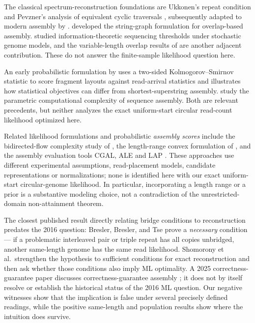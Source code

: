 The classical spectrum-reconstruction foundations are Ukkonen's repeat
condition and Pevzner's analysis of equivalent cyclic traversals
\parencite{ukkonen1992,pevzner1995}, subsequently adapted to modern
assembly by \textcite{bresler2013}.
\textcite{myers2005} developed the string-graph formulation for
overlap-based assembly. \textcite{motahari2013} studied information-theoretic sequencing thresholds
under stochastic genome models, and the variable-length overlap
results of \textcite{hui2016} are another adjacent
contribution. These do not answer the finite-sample likelihood
question here.

An early probabilistic formulation by \textcite{myers1995}
uses a two-sided Kolmogorov--Smirnov statistic to score fragment
layouts against read-arrival statistics and illustrates how
statistical objectives can differ from shortest-superstring
assembly. \textcite{nagarajan2009} study the parametric
computational complexity of sequence assembly. Both are
relevant precedents, but neither analyzes the exact
uniform-start circular read-count likelihood optimized here.

Related likelihood formulations and probabilistic
\emph{assembly scores} include the bidirected-flow
complexity study of \textcite{medvedev2007},
the length-range convex formulation of \textcite{varma2011},
and the assembly evaluation tools CGAL, ALE and LAP
\parencite{cgal2013,ale2013,ghodsi2013}.
These approaches use different experimental assumptions,
read-placement models, candidate representations or
normalizations; none is identified here with our exact
uniform-start circular-genome likelihood. In particular,
incorporating a length range or a prior is a substantive
modeling choice, not a contradiction of the
unrestricted-domain non-attainment theorem.

The closest published result directly relating bridge
conditions to reconstruction predates the 2016 question:
Bresler, Bresler, and Tse prove a \emph{necessary} condition --- if a
problematic interleaved pair or triple repeat has all copies unbridged, another
same-length genome has the same read likelihood. Shomorony et al.\ strengthen
the hypothesis to sufficient conditions for exact reconstruction and then ask
whether those conditions also imply ML optimality. A 2025 correctness-guarantee
paper discusses correctness-guarantee assembly
\parencite{salmela2025}; it does not by itself resolve or establish
the historical status of the 2016 ML question. Our negative
witnesses show that the implication is false under several
precisely defined readings, while the positive same-length and
population results show where the intuition does survive.

